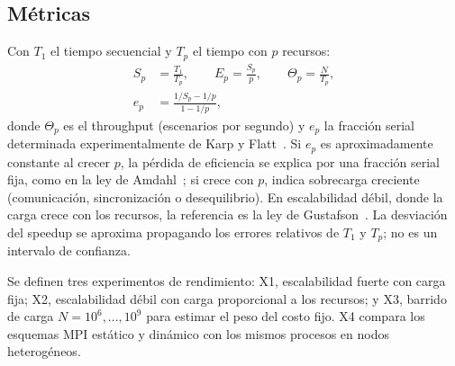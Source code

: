 \subsection{Métricas}

Con $T_1$ el tiempo secuencial y $T_p$ el tiempo con $p$ recursos:
\begin{align}
S_p &= \frac{T_1}{T_p}, \qquad E_p = \frac{S_p}{p}, \qquad \Theta_p = \frac{N}{T_p}, \label{eq:speedup}\\
e_p &= \frac{1/S_p - 1/p}{1 - 1/p}, \label{eq:karpflatt}
\end{align}
donde $\Theta_p$ es el throughput (escenarios por segundo) y $e_p$ la fracción serial determinada experimentalmente de Karp y Flatt~\cite{karp1990}. Si $e_p$ es aproximadamente constante al crecer $p$, la pérdida de eficiencia se explica por una fracción serial fija, como en la ley de Amdahl~\cite{amdahl1967}; si crece con $p$, indica sobrecarga creciente (comunicación, sincronización o desequilibrio). En escalabilidad débil, donde la carga crece con los recursos, la referencia es la ley de Gustafson~\cite{gustafson1988}. La desviación del speedup se aproxima propagando los errores relativos de $T_1$ y $T_p$; no es un intervalo de confianza.

Se definen tres experimentos de rendimiento: X1, escalabilidad fuerte con carga fija; X2, escalabilidad débil con carga proporcional a los recursos; y X3, barrido de carga $N = 10^{6}, \dots, 10^{9}$ para estimar el peso del costo fijo. X4 compara los esquemas MPI estático y dinámico con los mismos procesos en nodos heterogéneos.
